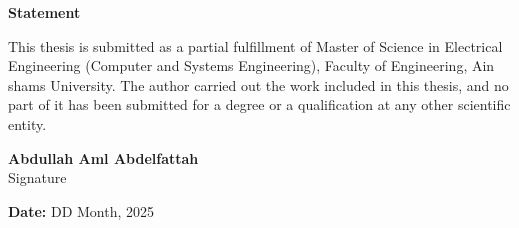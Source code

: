 \cleardoublepage
\setlength{\thesignaturewidth}{2cm}
\newpage
\thispagestyle{empty}
\begin{center}\huge\textbf{Statement}\end{center}
\Large
\vfill
This thesis is submitted as a partial fulfillment of Master of Science in Electrical Engineering (Computer and Systems Engineering), Faculty of Engineering, Ain shams University.
The author carried out the work included in this thesis, and no part of it has been submitted for a degree or a qualification at any other scientific entity. 







\vfill
\begin{flushright}
\large
\textbf{Abdullah Aml Abdelfattah} \\

\small
Signature \\
\dotfill \hspace{0.1\thesignaturewidth}

\textbf{Date:} DD Month, 2025 \\
\end{flushright}
\vfill

\normalsize
